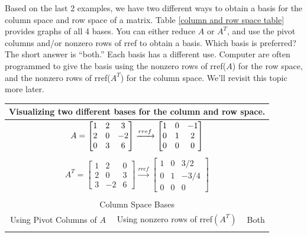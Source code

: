 Based on the last 2 examples, we have two different ways to obtain a basis for the column space and row space of a matrix. Table \ref{column and row space table} provides graphs of all 4 bases. You can either reduce $A$ or $A^T$, and use the pivot columns and/or nonzero rows of rref to obtain a basis. Which basis is preferred?  The short answer is ``both.'' Each basis has a different use.  Computer are often programmed to give the basis using the nonzero rows of rref($A$) for the row space, and the nonzero rows of rref($A^T$) for the column space. We'll revisit this topic more later.

\begin{table}

\begin{tabular}{ccc}
\multicolumn{3}{c}{
Visualizing two different bases for the column and row space. 
}
\\\hline
\multicolumn{3}{c}{
$
A=
\begin{bmatrix}
\begin{matrix} 1\\2\\0 \end{matrix}
&\begin{matrix} 2\\0\\3 \end{matrix}
&\begin{matrix} 3\\-2\\6 \end{matrix}
\end{bmatrix}
\xrightarrow{rref}
\begin{bmatrix}
\begin{matrix} 1\\0\\0 \end{matrix}
&\begin{matrix} 0\\1\\0 \end{matrix}
&\begin{matrix} -1\\2\\0 \end{matrix}
\end{bmatrix}
$}
\\ \\
\multicolumn{3}{c}{
$
A^T
=
\begin{bmatrix}
 1 & 2 & 0 \\
 2 & 0 & 3 \\
 3 & -2 & 6
\end{bmatrix}
\xrightarrow{rref}
\begin{bmatrix}
 1 & 0 & {3}/{2} \\
 0 & 1 & -{3}/{4} \\
 0 & 0 & 0
\end{bmatrix}
$
}
\\ \\
\hline\hline \multicolumn{3}{c}{Column Space Bases}\\
\hline Using Pivot Columns of $A$ & Using nonzero rows of rref$(A^T)$ & Both\\ \\

\end{tabular}
\end{table}
